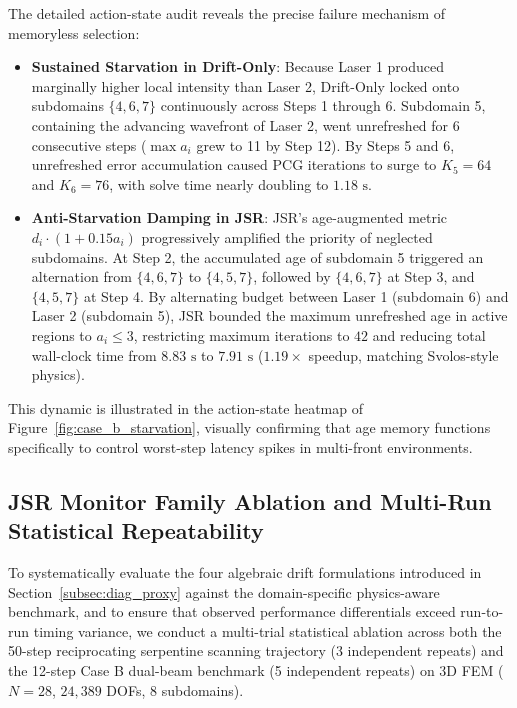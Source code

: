 \documentclass[preprint,12pt,3p]{elsarticle}
\begin{document}
The detailed action-state audit reveals the precise failure mechanism of memoryless selection:
\begin{itemize}
    \item \textbf{Sustained Starvation in Drift-Only}: Because Laser 1 produced marginally higher local intensity than Laser 2, Drift-Only locked onto subdomains $\{4, 6, 7\}$ continuously across Steps 1 through 6. Subdomain 5, containing the advancing wavefront of Laser 2, went unrefreshed for 6 consecutive steps ($\max a_i$ grew to 11 by Step 12). By Steps 5 and 6, unrefreshed error accumulation caused PCG iterations to surge to \textbf{$K_5 = 64$} and \textbf{$K_6 = 76$}, with solve time nearly doubling to $1.18\text{ s}$.
    \item \textbf{Anti-Starvation Damping in JSR}: JSR's age-augmented metric $d_i \cdot (1 + 0.15 a_i)$ progressively amplified the priority of neglected subdomains. At Step 2, the accumulated age of subdomain 5 triggered an alternation from $\{4, 6, 7\}$ to $\{4, 5, 7\}$, followed by $\{4, 6, 7\}$ at Step 3, and $\{4, 5, 7\}$ at Step 4. By alternating budget between Laser 1 (subdomain 6) and Laser 2 (subdomain 5), JSR bounded the maximum unrefreshed age in active regions to $a_i \le 3$, restricting maximum iterations to \textbf{$42$} and reducing total wall-clock time from $8.83\text{ s}$ to $7.91\text{ s}$ ($1.19\times$ speedup, matching Svolos-style physics).
\end{itemize}
This dynamic is illustrated in the action-state heatmap of Figure~\ref{fig:case_b_starvation}, visually confirming that age memory functions specifically to control worst-step latency spikes in multi-front environments.

\subsection{JSR Monitor Family Ablation and Multi-Run Statistical Repeatability}
\label{subsec:res_monitor_ablation}

To systematically evaluate the four algebraic drift formulations introduced in Section~\ref{subsec:diag_proxy} against the domain-specific physics-aware benchmark, and to ensure that observed performance differentials exceed run-to-run timing variance, we conduct a multi-trial statistical ablation across both the 50-step reciprocating serpentine scanning trajectory (3 independent repeats) and the 12-step Case B dual-beam benchmark (5 independent repeats) on 3D FEM ($N=28$, $24{,}389$ DOFs, 8 subdomains). 
\end{document}
